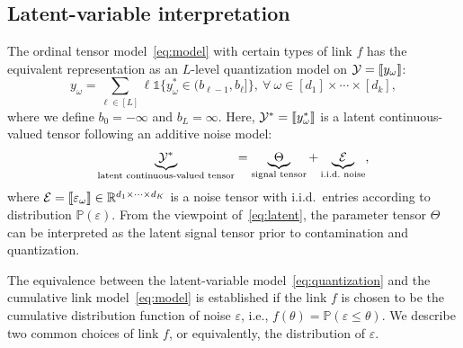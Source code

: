 \documentclass{article}
\theoremstyle{plain}
\theoremstyle{definition}
\newcommand*{\KeepStyleUnderBrace}[1]{%
  \mathop{%
    \mathchoice
    {\underbrace{\displaystyle#1}}%
    {\underbrace{\textstyle#1}}%
    {\underbrace{\scriptstyle#1}}%
    {\underbrace{\scriptscriptstyle#1}}%
  }\limits
}
\begin{document}
\vspace{-.1cm}
\subsection{Latent-variable interpretation}\label{sec:latent}
\vspace{-.1cm}

The ordinal tensor model~\eqref{eq:model} with certain types of link $f$ has the equivalent representation as an $L$-level quantization model on $\mathcal{Y}=\llbracket y_\omega \rrbracket$:
\begin{equation}\label{eq:quantization}
y_\omega=\sum_{\ell\in[L]} \ell \mathds{1}\{y^*_\omega \in(b_{\ell-1},b_\ell]\},\ \forall \ \omega\in[d_1]\times \cdots \times [d_k],
\end{equation}
where we define $b_0=-\infty$ and $b_L=\infty$. Here, $\mathcal{Y}^*=\llbracket y^*_\omega \rrbracket$ is a latent continuous-valued tensor following an additive noise model:
\begin{align}\label{eq:latent}
\KeepStyleUnderBrace{\tY^*}_{\text{latent continuous-valued tensor}}=\KeepStyleUnderBrace{\Theta}_{\text{signal tensor}}+\KeepStyleUnderBrace{\tE}_{\text{i.i.d.\ noise}},
\end{align}
where $\mathcal{E}=\llbracket \varepsilon_\omega \rrbracket\in\mathbb{R}^{d_1\times \cdots \times d_K}$ is a noise tensor with i.i.d.\ entries according to distribution $\mathbb{P}(\varepsilon)$. From the viewpoint of~\eqref{eq:latent}, the parameter tensor $\Theta$ can be interpreted as the latent signal tensor prior to contamination and quantization.

The equivalence between the latent-variable model~\eqref{eq:quantization} and the cumulative link model~\eqref{eq:model} is established if the link $f$ is chosen to be the cumulative distribution function of noise $\varepsilon$, i.e., $f(\theta)=\mathbb{P}(\varepsilon\leq \theta)$. We describe two common choices of link $f$, or equivalently, the distribution of $\varepsilon$.
\end{document}
